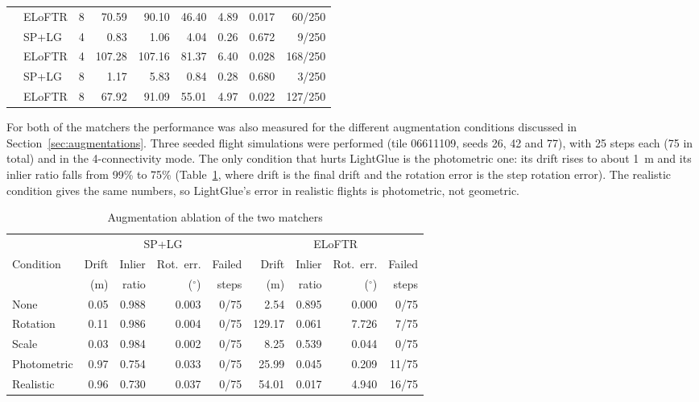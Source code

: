 \documentclass[english, Lau, oneside]{sapthesis}%
\begin{document}
\begin{table}[!htbp]
\begin{tabular}{llcrrrrrr}
     & ELoFTR & 8 & 70.59 & 90.10 & 46.40 & 4.89 & 0.017 & 60/250 \\
    \addlinespace
    06611116 & SP+LG & 4 & 0.83 & 1.06 & 4.04 & 0.26 & 0.672 & 9/250 \\
     & ELoFTR & 4 & 107.28 & 107.16 & 81.37 & 6.40 & 0.028 & 168/250 \\
     & SP+LG & 8 & 1.17 & 5.83 & 0.84 & 0.28 & 0.680 & 3/250 \\
     & ELoFTR & 8 & 67.92 & 91.09 & 55.01 & 4.97 & 0.022 & 127/250 \\
    \bottomrule
  \end{tabular}
\end{table}

For both of the matchers the performance was also measured for the different augmentation conditions discussed in Section~\ref{sec:augmentations}. Three seeded flight simulations were performed (tile 06611109, seeds 26, 42 and 77), with 25 steps each (75 in total) and in the 4-connectivity mode. The only condition that hurts LightGlue is the photometric one: its drift rises to about 1~m and its inlier ratio falls from 99\% to 75\% (Table~\ref{tab:vo-ablation}, where drift is the final drift and the rotation error is the step rotation error). The realistic condition gives the same numbers, so LightGlue's error in realistic flights is photometric, not geometric.

\begin{table}[!htbp]
  \centering
  \caption{Augmentation ablation of the two matchers}
  \label{tab:vo-ablation}
  \small
  \begin{tabular}{lrrrrrrrr}
    \toprule
     & \multicolumn{4}{c}{SP+LG} & \multicolumn{4}{c}{ELoFTR} \\
    \cmidrule(lr){2-5}\cmidrule(lr){6-9}
    Condition & Drift & Inlier & Rot.\ err. & Failed & Drift & Inlier & Rot.\ err. & Failed \\
     & (m) & ratio & ($^\circ$) & steps & (m) & ratio & ($^\circ$) & steps \\
    \midrule
    None & 0.05 & 0.988 & 0.003 & 0/75 & 2.54 & 0.895 & 0.000 & 0/75 \\
    Rotation & 0.11 & 0.986 & 0.004 & 0/75 & 129.17 & 0.061 & 7.726 & 7/75 \\
    Scale & 0.03 & 0.984 & 0.002 & 0/75 & 8.25 & 0.539 & 0.044 & 0/75 \\
    Photometric & 0.97 & 0.754 & 0.033 & 0/75 & 25.99 & 0.045 & 0.209 & 11/75 \\
    Realistic & 0.96 & 0.730 & 0.037 & 0/75 & 54.01 & 0.017 & 4.940 & 16/75 \\
    \bottomrule
  \end{tabular}
\end{table}
\end{document}
